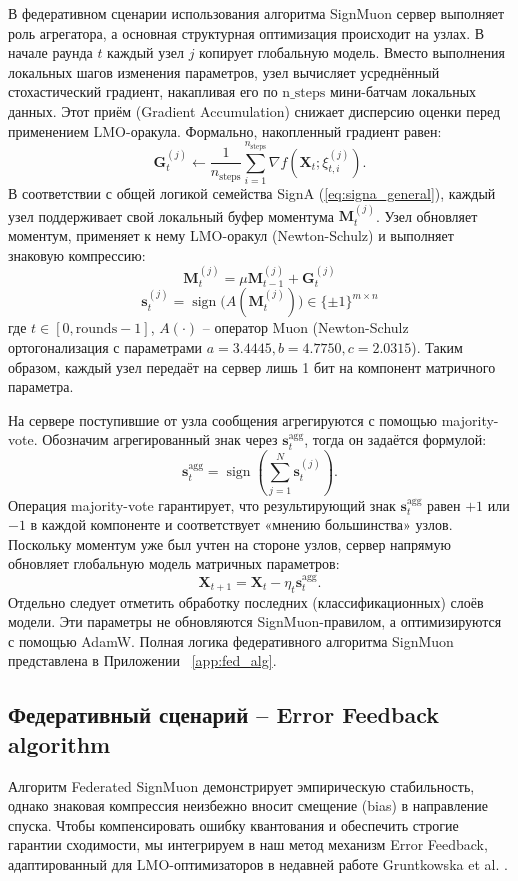 \documentclass{article}
\begin{document}
В федеративном сценарии использования алгоритма SignMuon сервер выполняет роль агрегатора, а основная структурная оптимизация происходит на узлах. В начале раунда $t$ каждый узел $j$ копирует глобальную модель. Вместо выполнения локальных шагов изменения параметров, узел вычисляет усреднённый стохастический градиент, накапливая его по $\mathrm{n\_steps}$ мини-батчам локальных данных. Этот приём (Gradient Accumulation) снижает дисперсию оценки перед применением LMO-оракула. Формально, накопленный градиент равен:
$$
\mathbf{G}_t^{(j)}\gets\frac{1}{n_{\text{steps}}}\sum_{i=1}^{n_{\text{steps}}}\nabla f(\mathbf{X}_t;\xi_{t,i}^{(j)}).
$$
В соответствии с общей логикой семейства SignA (\ref{eq:signa_general}), каждый узел поддерживает свой локальный буфер моментума $\mathbf{M}_t^{(j)}$. Узел обновляет моментум, применяет к нему LMO-оракул (Newton-Schulz) и выполняет знаковую компрессию:
$$ \mathbf{M}_t^{(j)} = \mu \mathbf{M}_{t-1}^{(j)} + \mathbf{G}_t^{(j)} $$
$$ \mathbf{s}_t^{(j)} = \operatorname{sign}\bigl(A(\mathbf{M}_t^{(j)})\bigr) \in \{\pm 1\}^{m \times n} $$
где $t\in[0, \mathrm{rounds}-1]$, $A(\cdot)$ -- оператор Muon (Newton-Schulz ортогонализация с параметрами $a=3.4445, b=4.7750, c=2.0315$). Таким образом, каждый узел передаёт на сервер лишь 1 бит на компонент матричного параметра.

На сервере поступившие от узла сообщения агрегируются с помощью majority-vote. Обозначим агрегированный знак через $\mathbf{s}_t^{\mathrm{agg}}$, тогда он задаётся формулой:
\begin{equation}
\mathbf{s}_t^{\mathrm{agg}}=\operatorname{sign}\!\left(\sum_{j=1}^N \mathbf{s}_t^{(j)}\right).
\end{equation}
Операция majority-vote гарантирует, что результирующий знак $\mathbf{s}_t^{\mathrm{agg}}$ равен $+1$ или $-1$ в каждой компоненте и соответствует «мнению большинства» узлов. Поскольку моментум уже был учтен на стороне узлов, сервер напрямую обновляет глобальную модель матричных параметров:
\[
\mathbf{X}_{t+1} = \mathbf{X}_t - \eta_t \mathbf{s}_t^{\mathrm{agg}}.
\]
Отдельно следует отметить обработку последних (классификационных) слоёв  модели. Эти параметры не обновляются SignMuon-правилом, а оптимизируются с помощью AdamW. Полная логика федеративного алгоритма SignMuon представлена в Приложении ~\ref{app:fed_alg}.

\subsection{Федеративный сценарий -- Error Feedback algorithm}
Алгоритм Federated SignMuon демонстрирует эмпирическую стабильность, однако знаковая компрессия неизбежно вносит смещение (bias) в направление спуска. Чтобы компенсировать ошибку квантования и обеспечить строгие гарантии сходимости, мы интегрируем в наш метод механизм Error Feedback, адаптированный для LMO-оптимизаторов в недавней работе Gruntkowska et al. \cite{gruntkowska2025error}. 
\end{document}
